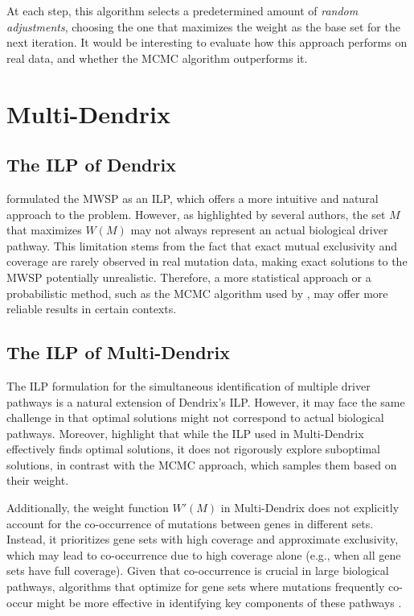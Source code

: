 At each step, this algorithm selects a predetermined amount of \textit{random adjustments}, choosing the one that maximizes the weight as the base set for the next iteration. It would be interesting to evaluate how this approach performs on real data, and whether the MCMC algorithm outperforms it.

\section{Multi-Dendrix}

\subsection{The ILP of Dendrix}

\textcite{multi-dendrix} formulated the MWSP as an ILP, which offers a more intuitive and natural approach to the problem. However, as highlighted by several authors, the set $M$ that maximizes $W(M)$ may not always represent an actual biological driver pathway. This limitation stems from the fact that exact mutual exclusivity and coverage are rarely observed in real mutation data, making exact solutions to the MWSP potentially unrealistic. Therefore, a more statistical approach or a probabilistic method, such as the MCMC algorithm used by \textcite{dendrix}, may offer more reliable results in certain contexts.

\subsection{The ILP of Multi-Dendrix}

The ILP formulation for the simultaneous identification of multiple driver pathways is a natural extension of Dendrix's ILP. However, it may face the same challenge in that optimal solutions might not correspond to actual biological pathways. Moreover, \textcite{multi-dendrix} highlight that while the ILP used in Multi-Dendrix effectively finds optimal solutions, it does not rigorously explore suboptimal solutions, in contrast with the MCMC approach, which samples them based on their weight.

Additionally, the weight function $W'(M)$ in Multi-Dendrix does not explicitly account for the co-occurrence of mutations between genes in different sets. Instead, it prioritizes gene sets with high coverage and approximate exclusivity, which may lead to co-occurrence due to high coverage alone (e.g., when all gene sets have full coverage). Given that co-occurrence is crucial in large biological pathways, algorithms that optimize for gene sets where mutations frequently co-occur might be more effective in identifying key components of these pathways \cite{multi-dendrix}.

